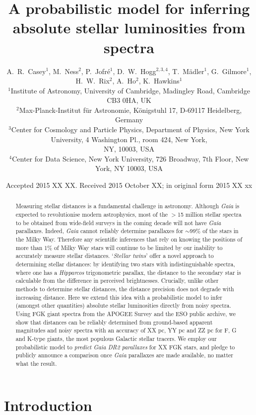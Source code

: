 \documentclass[useAMS,usenatbib]{mn2e}
\title[Inferring absolute stellar luminosities]{A probabilistic model for 
    inferring absolute stellar luminosities from spectra}
\author[Casey et al.]{A.~R.~Casey$^1$, M.~Ness$^2$, P.~Jofr\'e$^1$, 
    D.~W.~Hogg$^{2,3,4}$, T.~M\"adler$^1$, G.~Gilmore$^1$, \newauthor 
    H.~W.~Rix$^2$, A.~Ho$^2$, K.~Hawkins$^1$ \\ 
$^1$Institute of Astronomy, University of Cambridge, Madingley Road, Cambridge
    CB3 0HA, UK\\
$^2$Max-Planck-Institut f\"ur Astronomie, K\"onigstuhl 17, D-69117 Heidelberg,
    Germany\\
$^3$Center for Cosmology and Particle Physics, Department of Physics, New York
    University, 4 Washington Pl., room 424, New York, \\
    NY, 10003, USA\\
$^4$Center for Data Science, New York University, 726 Broadway, 7th Floor,
    New York, NY 10003, USA}
\begin{document}
\date{Accepted 2015 XX XX. Received 2015 October XX; in original form 2015 XX xx}

\pagerange{\pageref{firstpage}--\pageref{lastpage}} 

\maketitle

\label{firstpage}

\begin{abstract}
Measuring stellar distances is a fundamental challenge in astronomy. Although 
\textit{Gaia} is expected to revolutionise modern astrophysics, most of the 
$>$15 million stellar spectra to be obtained from wide-field surveys in the 
coming decade will not have \textit{Gaia} parallaxes. Indeed, \textit{Gaia} cannot
reliably determine parallaxes for $\sim$99\% of the stars in the Milky Way. Therefore 
any scientific inferences that rely on knowing the positions of more than 1\% of 
Milky Way stars will continue to be limited by our inability to accurately 
measure stellar distances. `\textit{Stellar twins}' offer a novel approach to 
determining stellar distances: by identifying two stars with indistinguishable 
spectra, where one has a \textit{Hipparcos} trigonometric parallax, the distance
 to the secondary star is calculable from the difference in perceived 
 brightnesses. Crucially, unlike other methods to determine stellar distances, 
the distance precision does not degrade with increasing distance. Here we extend
 this idea with a probabilistic model to infer (amongst other quantities) 
absolute stellar luminosities directly from noisy spectra. Using FGK giant 
spectra from the APOGEE Survey and the ESO public archive, we show that 
distances can be reliably determined from ground-based apparent magnitudes and 
noisy spectra with an accuracy of XX pc, YY pc and ZZ pc for F, G and K-type 
giants, the most populous Galactic stellar tracers. We employ our probabilistic 
model to \textit{predict Gaia DR2 parallaxes} for XX FGK stars, and pledge to 
publicly announce a comparison once \textit{Gaia} parallaxes are made available,
 no matter what the result.
\end{abstract}

\begin{keywords}
\end{keywords}

\section{Introduction}
\end{document}
